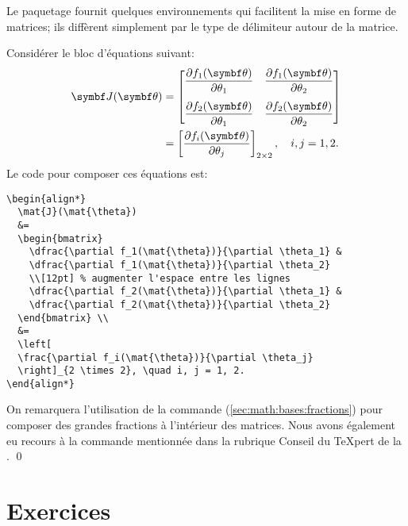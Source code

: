 \begin{exemple}
  \label{ex:math:matrices}
  Le paquetage  fournit quelques environnements qui
  facilitent la mise en forme de matrices; ils diffèrent simplement
  par le type de délimiteur autour de la matrice.

  Considérer le bloc d'équations suivant:
  \begin{align*}
    \mat{J}(\mat{\theta})
    &=
      \begin{bmatrix}
        \dfrac{\partial f_1(\mat{\theta})}{\partial \theta_1} &
        \dfrac{\partial f_1(\mat{\theta})}{\partial \theta_2} \\[12pt]
        \dfrac{\partial f_2(\mat{\theta})}{\partial \theta_1} &
        \dfrac{\partial f_2(\mat{\theta})}{\partial \theta_2}
      \end{bmatrix} \\
    &=
      \left[
      \frac{\partial f_i(\mat{\theta})}{\partial \theta_j}
      \right]_{2 \times 2}, \quad i, j = 1, 2.
  \end{align*}
  Le code pour composer ces équations est:
\begin{lstlisting}
\begin{align*}
  \mat{J}(\mat{\theta})
  &=
  \begin{bmatrix}
    \dfrac{\partial f_1(\mat{\theta})}{\partial \theta_1} &
    \dfrac{\partial f_1(\mat{\theta})}{\partial \theta_2}
    \\[12pt] % augmenter l'espace entre les lignes
    \dfrac{\partial f_2(\mat{\theta})}{\partial \theta_1} &
    \dfrac{\partial f_2(\mat{\theta})}{\partial \theta_2}
  \end{bmatrix} \\
  &=
  \left[
  \frac{\partial f_i(\mat{\theta})}{\partial \theta_j}
  \right]_{2 \times 2}, \quad i, j = 1, 2.
\end{align*}
\end{lstlisting}
  On remarquera l'utilisation de la commande \cmd{\dfrac}
  (\autoref{sec:math:bases:fractions}) pour composer des grandes
  fractions à l'intérieur des matrices. Nous avons également eu
  recours à la commande \cmdprint{\mat} mentionnée dans la
  rubrique Conseil du {\TeX}pert de la . %
  \qed
\end{exemple}



\section{Exercices}
\label{sec:math:exercices}

